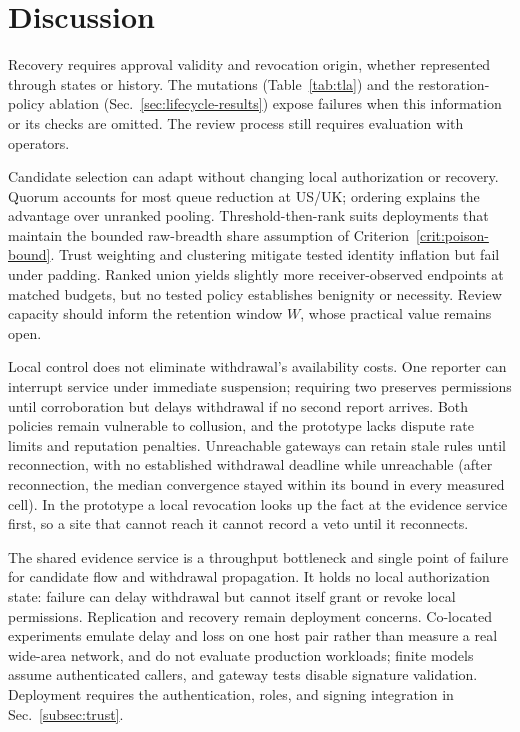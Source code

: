 \documentclass[journal]{IEEEtran}
\theoremstyle{definition}
\begin{document}
\section{Discussion}
\label{sec:discussion}

Recovery requires approval validity and revocation origin, whether represented through states or history. The mutations (Table~\ref{tab:tla}) and the restoration-policy ablation (Sec.~\ref{sec:lifecycle-results}) expose failures when this information or its checks are omitted. The review process still requires evaluation with operators.

Candidate selection can adapt without changing local authorization or recovery. Quorum accounts for most queue reduction at US/UK; ordering explains the advantage over unranked pooling. Threshold-then-rank suits deployments that maintain the bounded raw-breadth share assumption of Criterion~\ref{crit:poison-bound}. Trust weighting and clustering mitigate tested identity inflation but fail under padding. Ranked union yields slightly more receiver-observed endpoints at matched budgets, but no tested policy establishes benignity or necessity. Review capacity should inform the retention window $W$, whose practical value remains open.

Local control does not eliminate withdrawal's availability costs. One reporter can interrupt service under immediate suspension; requiring two preserves permissions until corroboration but delays withdrawal if no second report arrives. Both policies remain vulnerable to collusion, and the prototype lacks dispute rate limits and reputation penalties. Unreachable gateways can retain stale rules until reconnection, with no established withdrawal deadline while unreachable (after reconnection, the median convergence stayed within its bound in every measured cell). In the prototype a local revocation looks up the fact at the evidence service first, so a site that cannot reach it cannot record a veto until it reconnects.


The shared evidence service is a throughput bottleneck and single point of failure for candidate flow and withdrawal propagation. It holds no local authorization state: failure can delay withdrawal but cannot itself grant or revoke local permissions. Replication and recovery remain deployment concerns. Co-located experiments emulate delay and loss on one host pair rather than measure a real wide-area network, and do not evaluate production workloads; finite models assume authenticated callers, and gateway tests disable signature validation. Deployment requires the authentication, roles, and signing integration in Sec.~\ref{subsec:trust}.
\end{document}
